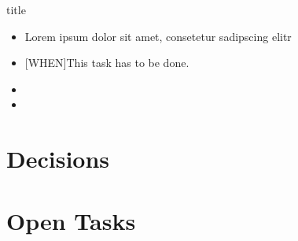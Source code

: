 \documentclass[a4paper,11pt, openright, DIV15, BCOR15mm]{scrartcl}
\author{author}
\title{\minuteTitle}
\date{\minuteDate}
\newcommand{\minuteTitle}{title}
\begin{document}
\begin{Minutes}{\minuteTitle}
\thispagestyle{empty}
\maketitle

\begin{itemize}
	\item Lorem ipsum dolor sit amet, consetetur sadipscing elitr
	\item {}[WHEN]{This task has to be done.}
	\item {}
	\item {}
\end{itemize}

\section{Decisions}
\label{minutes!decision}
\listofdecisions
\section{Open Tasks}
\label{minutes!tasks}
\listoftasks
\signature{signature}


\end{Minutes}
\end{document}
